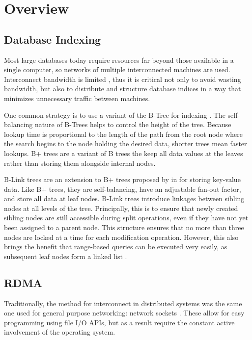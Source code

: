 \section{Overview}

\subsection{Database Indexing}
\label{sec:indexing}

Most large databases today require resources far beyond those available in a single computer, so networks of multiple interconnected machines are used. Interconnect bandwidth is limited \autocite{binnig-vldb-2016}, thus it is critical not only to avoid wasting bandwidth, but also to distribute and structure database indices in a way that minimizes unnecessary traffic between machines.

One common strategy is to use a variant of the B-Tree for indexing \autocite{ma-tpds-2022}. The self-balancing nature of B-Trees helps to control the height of the tree. Because lookup time is proportional to the length of the path from the root node where the search begins to the node holding the desired data, shorter trees mean faster lookups. B+ trees are a variant of B trees the keep all data values at the leaves rather than storing them alongside internal nodes.

B-Link trees are an extension to B+ trees proposed by \citeauthor{b-link} in \citeyear{b-link} for storing key-value data. Like B+ trees, they are self-balancing, have an adjustable fan-out factor, and store all data at leaf nodes.
B-Link trees introduce linkages between sibling nodes at all levels of the tree. Principally, this is to ensure that newly created sibling nodes are still accessible during split operations, even if they have not yet been assigned to a parent node. This structure ensures that no more than three nodes are locked at a time for each modification operation. However, this also brings the benefit that range-based queries can be executed very easily, as subsequent leaf nodes form a linked list \autocite{b-link}.


\subsection{RDMA}
\label{sec:rdma}

Traditionally, the method for interconnect in distributed systems was the same one used for general purpose networking: network sockets \autocite{binnig-vldb-2016}. These allow for easy programming using file I/O APIs, but as a result require the constant active involvement of the operating system.

